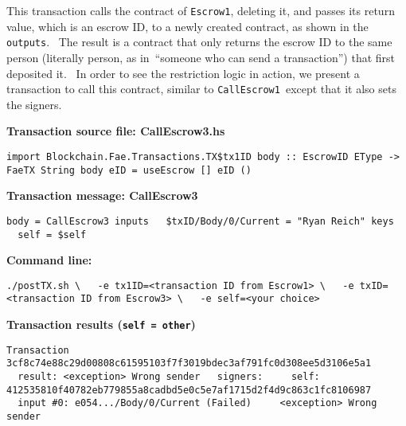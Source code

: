 \documentclass[11pt]{article}
\newcommand{\codeblock}[1]{\begin{mdframed}[
    backgroundcolor=header-color,
    linecolor=header-color,
    innertopmargin=10pt,
    ]{\texttt{#1}}\end{mdframed}}
\begin{document}
This transaction calls the contract of \texttt{Escrow1}, deleting it, and passes its return value, which is an escrow ID, to a newly created contract, as shown in the \texttt{outputs}.  The result is a contract that only returns the escrow ID to the same person (literally person, as in “someone who can send a transaction”) that first deposited it.  In order to see the restriction logic in action, we present a transaction to call this contract, similar to \texttt{CallEscrow1} except that it also sets the signers.


\vspace{11pt}

\textbf{Transaction source file: CallEscrow3.hs}

\codeblock{import Blockchain.Fae.Transactions.TX\$tx1ID\newline
\newline
body :: EscrowID EType -\textgreater{} FaeTX String\newline
body eID = useEscrow {[}{]} eID ()}

\textbf{Transaction message: CallEscrow3}

\codeblock{body = CallEscrow3\newline
inputs\newline
  \$txID\slash{}Body\slash{}0\slash{}Current = "Ryan Reich"\newline
keys\newline
  self = \$self}

\textbf{Command line:}

\codeblock{.\slash{}postTX.sh \textbackslash{}\newline
  -e tx1ID=\textless{}transaction ID from Escrow1\textgreater{} \textbackslash{}\newline
  -e txID=\textless{}transaction ID from Escrow3\textgreater{} \textbackslash{}\newline
  -e self=\textless{}your choice\textgreater{}}

\textbf{Transaction results (}\textbf{\texttt{self = other}}\textbf{)}

\codeblock{Transaction 3cf8c74e88c29d00808c61595103f7f3019bdec3af791fc0d308ee5d3106e5a1\newline
  result: \textless{}exception\textgreater{} Wrong sender\newline
  signers:\newline
    self: 412535810f40782eb779855a8cadbd5e0c5e7af1715d2f4d9c863c1fc8106987\newline
  input \#0: e054...\slash{}Body\slash{}0\slash{}Current (Failed)\newline
    \textless{}exception\textgreater{} Wrong sender}
\end{document}
